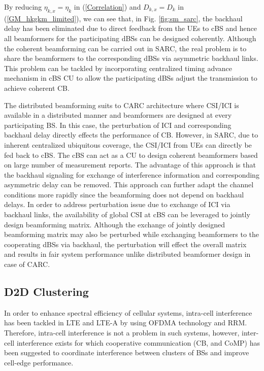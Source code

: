 \documentclass[article,10pt,twocolumn]{IEEEtran}
\begin{document}
By reducing $\eta_{k,x} = \eta_{k}$ in (\ref{Correlation}) and $D_{k,x} = D_k$ in (\ref{GM_hkgkm_limited}), we can see that, in Fig. \ref{fig:sm_sarc}, the backhaul delay has been eliminated due to direct feedback from the UEs to cBS and hence all beamformers for the participating dBSs can be designed coherently. Although the coherent beamforming can be carried out in SARC, the real problem is to share the beamformers to the corresponding dBSs via asymmetric backhaul links. This problem can be tackled by incorporating centralized timing advance mechanism in cBS CU to allow the participating dBSs adjust the transmission to achieve coherent CB.

The distributed beamforming suits to CARC architecture where CSI/ICI is available in a distributed manner and beamformers are designed at every participating BS. In this case, the perturbation of ICI and corresponding backhaul delay directly effects the performance of CB. However, in SARC, due to inherent centralized ubiquitous coverage, the CSI/ICI from UEs can directly be fed back to cBS. The cBS can act as a CU to design coherent beamformers based on large number of measurement reports. The advantage of this approach is that the backhaul signaling for exchange of interference information and corresponding asymmetric delay can be removed. This approach can further adapt the channel conditions more rapidly since the beamforming does not depend on backhaul delays. In order to address perturbation issue due to exchange of ICI via backhaul links, the availability of global CSI at cBS can be leveraged to jointly design beamforming matrix. Although the exchange of jointly designed beamforming matrix may also be perturbed while exchanging beamformers to the cooperating dBSs via backhaul, the perturbation will effect the overall matrix and results in fair system performance unlike distributed beamformer design in case of CARC.
\subsection{D2D Clustering}\label{sec:Open_Area}
In order to enhance spectral efficiency of cellular systems, intra-cell interference has been tackled in LTE and LTE-A by using OFDMA technology and RRM. Therefore, intra-cell interference is not a problem in such systems, however, inter-cell interference exists for which cooperative communication (CB, and CoMP) has been suggested \citep{marsch_coordinated_2011} to coordinate interference between clusters of BSs and improve cell-edge performance.
\end{document}
